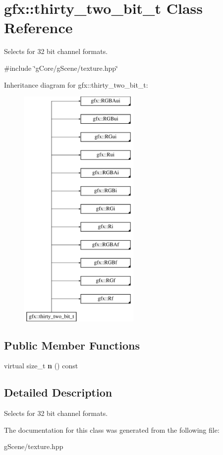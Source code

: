 \hypertarget{classgfx_1_1thirty__two__bit__t}{\section{gfx\-:\-:thirty\-\_\-two\-\_\-bit\-\_\-t Class Reference}
\label{classgfx_1_1thirty__two__bit__t}
}


Selects for 32 bit channel formats.  




{\ttfamily \#include \char`\"{}g\-Core/g\-Scene/texture.\-hpp\char`\"{}}

Inheritance diagram for gfx\-:\-:thirty\-\_\-two\-\_\-bit\-\_\-t\-:\begin{figure}[H]
\begin{center}
\leavevmode
\includegraphics[height=12.000000cm]{classgfx_1_1thirty__two__bit__t}
\end{center}
\end{figure}
\subsection*{Public Member Functions}
\begin{DoxyCompactItemize}
\item 
\hypertarget{classgfx_1_1thirty__two__bit__t_a7daa137faa8f1063883de3b6fe42a3bc}{virtual size\-\_\-t {\bfseries n} () const }\label{classgfx_1_1thirty__two__bit__t_a7daa137faa8f1063883de3b6fe42a3bc}

\end{DoxyCompactItemize}


\subsection{Detailed Description}
Selects for 32 bit channel formats. 

The documentation for this class was generated from the following file\-:\begin{DoxyCompactItemize}
\item 
g\-Scene/texture.\-hpp\end{DoxyCompactItemize}
